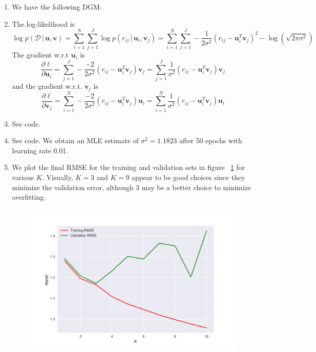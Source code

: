 \documentclass[submit]{harvardml}
\newcommand{\given}{\,|\,}
\theoremstyle{plain}
\begin{document}
\newpage
\begin{enumerate}[label=(\alph*)]
	\item We have the following DGM:
	\begin{center}
	\end{center}
	
	\item The log-likelihood is
	\[
	\log p(\mathcal{D}\given \bm{u}, \bm{v}) 
	= \sum_{i=1}^N \sum_{j=1}^J \log p(r_{ij}\given \bm{u}_i, \bm{v}_j) 
	= \sum_{i=1}^N \sum_{j=1}^J -\frac{1}{2\sigma^2} (r_{ij} - \bm{u}_i^T\bm{v}_j)^2 - \log(\sqrt{2\pi\sigma^2})
	\]
	The gradient w.r.t $\bm{u}_i$ is
	\[
	\frac{\partial\ell}{\partial\bm{u}_i} 
	= \sum_{j=1}^J -\frac{-2}{2\sigma^2} (r_{ij} - \bm{u}_i^T\bm{v}_j)\bm{v}_j
	= \sum_{j=1}^J \frac{1}{\sigma^2} (r_{ij} - \bm{u}_i^T\bm{v}_j)\bm{v}_j
	\]
	and the gradient w.r.t. $\bm{v}_j$ is
	\[
	\frac{\partial\ell}{\partial\bm{v}_j} 
	= \sum_{i=1}^N -\frac{-2}{2\sigma^2} (r_{ij} - \bm{u}_i^T\bm{v}_j)\bm{u}_i
	= \sum_{i=1}^N \frac{1}{\sigma^2} (r_{ij} - \bm{u}_i^T\bm{v}_j)\bm{u}_i
	\]
	
	\item See code. 
	
	\item See code. We obtain an MLE estimate of $\sigma^2 = 1.1823$ after 50 epochs with learning rate 0.01.
	
	\item We plot the final RMSE for the training and validation sets in figure ~\ref{2} for various $K$. Visually, $K = 3$ and $K = 9$ appear to be good choices since they minimize the validation error, although 3 may be a better choice to minimize overfitting.
	\begin{figure}
		\centering
		\includegraphics[width=.75\textwidth]{Figure_1}
		\label{2}
	\end{figure}


\end{enumerate}
\end{document}
